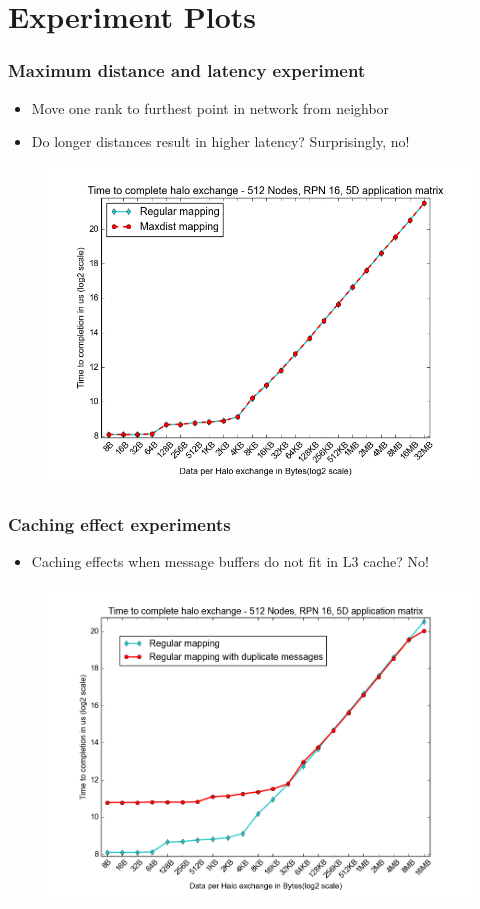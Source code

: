 \documentclass{beamer}
\begin{document}

\section{Experiment Plots}
\begin{frame}
\frametitle{Maximum distance and latency experiment}
\begin{itemize}
    \item Move one rank to furthest point in network from neighbor
    \item Do longer distances result in higher latency? Surprisingly, no!
\end{itemize}
\begin{figure}
\includegraphics[width=0.8\linewidth]{../regular_vs_maxdist.png}
\end{figure}
\end{frame}

\begin{frame}
\frametitle{Caching effect experiments}
\begin{itemize}
    \item Caching effects when message buffers do not fit in L3 cache? No!
\end{itemize}
\begin{figure}
\includegraphics[width=0.8\linewidth]{../cache_duplicates_vs_regular.png}
\end{figure}
\end{frame}
\end{document}
